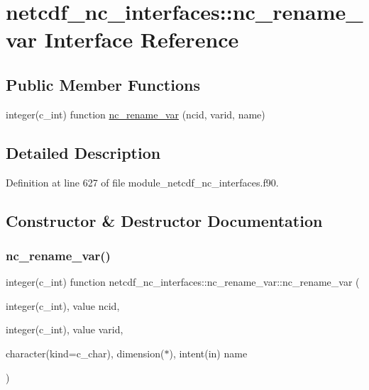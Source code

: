 \hypertarget{interfacenetcdf__nc__interfaces_1_1nc__rename__var}{}\section{netcdf\+\_\+nc\+\_\+interfaces\+:\+:nc\+\_\+rename\+\_\+var Interface Reference}
\label{interfacenetcdf__nc__interfaces_1_1nc__rename__var}
\subsection*{Public Member Functions}
\begin{DoxyCompactItemize}
\item 
integer(c\+\_\+int) function \hyperlink{interfacenetcdf__nc__interfaces_1_1nc__rename__var_a83b7b8bc87bfe9d537a8fa68b73545bb}{nc\+\_\+rename\+\_\+var} (ncid, varid, name)
\end{DoxyCompactItemize}


\subsection{Detailed Description}


Definition at line 627 of file module\+\_\+netcdf\+\_\+nc\+\_\+interfaces.\+f90.



\subsection{Constructor \& Destructor Documentation}
\mbox{\label{interfacenetcdf__nc__interfaces_1_1nc__rename__var_a83b7b8bc87bfe9d537a8fa68b73545bb}} 
\subsubsection{\texorpdfstring{nc\+\_\+rename\+\_\+var()}{nc\_rename\_var()}}
{\footnotesize\ttfamily integer(c\+\_\+int) function netcdf\+\_\+nc\+\_\+interfaces\+::nc\+\_\+rename\+\_\+var\+::nc\+\_\+rename\+\_\+var (\begin{DoxyParamCaption}\item[{integer(c\+\_\+int), value}]{ncid,  }\item[{integer(c\+\_\+int), value}]{varid,  }\item[{character(kind=c\+\_\+char), dimension($\ast$), intent(in)}]{name }\end{DoxyParamCaption})}



